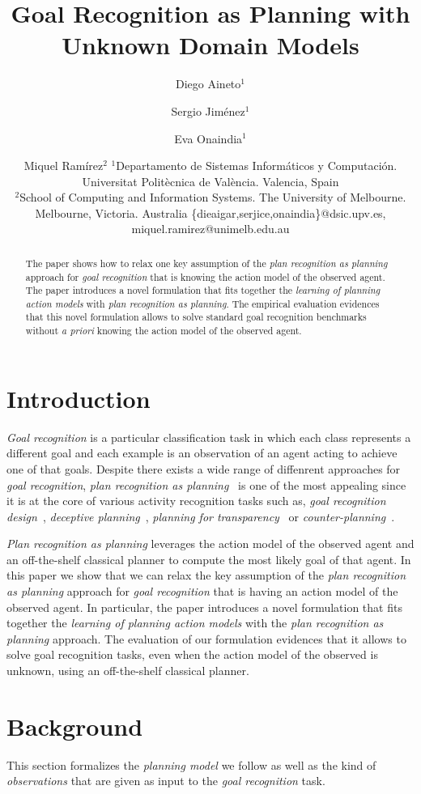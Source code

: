 \documentclass{article}
\title{Goal Recognition as Planning with Unknown Domain Models}
\author{
Diego Aineto$^1$\and
Sergio Jim\'enez$^1$\and
Eva Onaindia$^1$\And
\and
Miquel Ram\'irez$^2$
\affiliations
$^1${\small Departamento de Sistemas Inform\'aticos y Computaci\'on. Universitat Polit\`ecnica de Val\`encia. Valencia, Spain}\\
$^2${\small School of Computing and Information Systems. The University of Melbourne. Melbourne, Victoria. Australia}
\emails
{\scriptsize \{dieaigar,serjice,onaindia\}@dsic.upv.es, miquel.ramirez@unimelb.edu.au}}
\begin{document}
\maketitle

\begin{abstract}
The paper shows how to relax one key assumption of the {\em plan recognition as planning} approach for {\em goal recognition} that is knowing the action model of the observed agent. The paper introduces a novel formulation that fits together the {\em learning of planning action models} with {\em plan recognition as planning}. The empirical evaluation evidences that this novel formulation allows to solve standard goal recognition benchmarks without {\em a priori} knowing the action model of the observed agent.  
\end{abstract}

\section{Introduction}
\label{sec:introduction}
{\em Goal recognition} is a particular classification task in which each class represents a different goal and each example is an observation of an agent acting to achieve one of that goals. Despite there exists a wide range of diffenrent approaches for {\em goal recognition}, {\em plan recognition as planning}~\cite{ramirez2009plan,ramirez2012plan} is one of the most appealing since it is at the core of various activity recognition tasks such as, {\em goal recognition design}~\cite{KerenGK14}, {\em deceptive planning}~\cite{masters2017deceptive}, {\em planning for transparency}~\cite{macnally2018action} or {\em counter-planning}~\cite{PozancoEFB18}.

{\em Plan recognition as planning} leverages the action model of the observed agent and an off-the-shelf classical planner to compute the most likely goal of that agent. In this paper we show that we can relax the key assumption of the {\em plan recognition as planning} approach for {\em goal recognition} that is having an action model of the observed agent. In particular, the paper introduces a novel formulation that fits together the {\em learning of planning action models} with the {\em plan recognition as planning} approach. The evaluation of our formulation evidences that it allows to solve goal recognition tasks, even when the action model of the observed is unknown, using an off-the-shelf classical planner.



\section{Background}
\label{sec:background}
This section formalizes the {\em planning model} we follow as well as the kind of {\em observations} that are given as input to the {\em goal recognition} task.  
\end{document}
